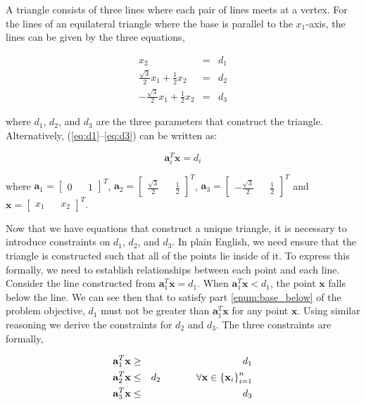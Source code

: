 \documentclass{article}
\begin{document}
A triangle consists of three lines where each pair of lines meets at a vertex.
For the lines of an equilateral triangle where the base is parallel to the $x_1$-axis, the lines can be given by the three equations,

\begin{eqnarray} \label{eq:d1}
x_2 &=& d_1 \\
\label{eq:d2}
\frac{\sqrt{3}}{2} x_1 + \frac{1}{2} x_2 &=& d_2\\
\label{eq:d3}
-\frac{\sqrt{3}}{2} x_1 + \frac{1}{2} x_2 &=& d_3
\end{eqnarray}

\noindent where $d_1$, $d_2$, and $d_3$ are the three parameters that construct the triangle.
Alternatively, (\ref{eq:d1}--\ref{eq:d3}) can be written as:

\begin{equation} \label{eq:triangle_lines_la}
\mathbf{a}_i^T \mathbf{x} = d_i
\end{equation}

\noindent where $\mathbf{a}_1 = \begin{bmatrix}0 && 1\end{bmatrix}^T$, $\mathbf{a}_2 = \begin{bmatrix}\frac{\sqrt{3}}{2} && \frac{1}{2}\end{bmatrix}^T$, $\mathbf{a}_3 = \begin{bmatrix}-\frac{\sqrt{3}}{2} && \frac{1}{2}\end{bmatrix}^T$ and $\mathbf{x} = \begin{bmatrix}x_1 && x_2\end{bmatrix}^T$.

Now that we have equations that construct a unique triangle, it is necessary to introduce constraints on $d_1$, $d_2$, and $d_3$.
In plain English, we need ensure that the triangle is constructed such that all of the points lie inside of it.
To express this formally, we need to establish relationships between each point and each line.
Consider the line constructed from $\mathbf{a}_1^T \mathbf{x} = d_1$. When $\mathbf{a}_1^T \mathbf{x} < d_1$, the point $\mathbf{x}$ falls below the line.
We can see then that to satisfy part \ref{enum:base_below} of the problem objective, $d_1$ must not be greater than $\mathbf{a}_1^T \mathbf{x}$ for any point $\mathbf{x}$.
Using similar reasoning we derive the constraints for $d_2$ and $d_3$. The three constraints are formally,

\begin{eqnarray}
\label{eq:const_1} \mathbf{a}_1^T \mathbf{x} &\ge& d_1\\
\label{eq:const_2} \mathbf{a}_2^T \mathbf{x} &\le& d_2 \hspace{0.5in} \forall{\mathbf{x}} \in \left\{ \mathbf{x}_i \right\}_{i=1}^n\\
\label{eq:const_3} \mathbf{a}_3^T \mathbf{x} &\le& d_3
\end{eqnarray}
\end{document}
